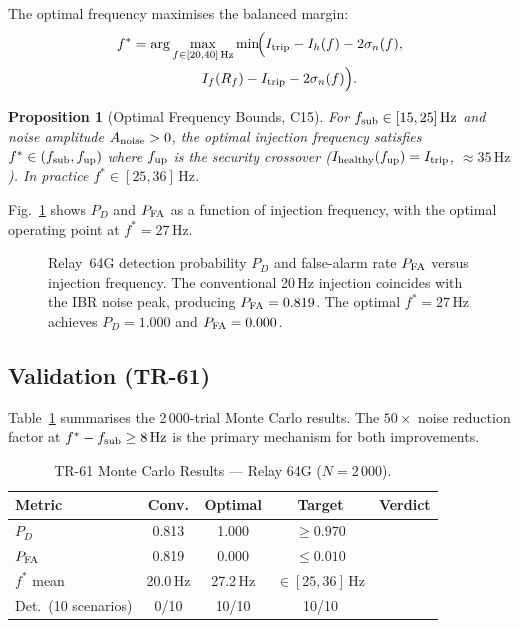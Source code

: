 \documentclass[journal,twoside]{IEEEtran}
\newcommand{\cmark}{\ding{51}}
\newtheorem{proposition}{Proposition}
\begin{document}
The optimal frequency maximises the balanced margin:
\begin{equation}
\begin{split}
  f^* &= \arg\max_{f \in [20,40]\,\text{Hz}}
  \min\!\Bigl(
    I_{\rm trip} - I_h(f) - 2\sigma_n(f),\\
  &\qquad\qquad\quad
    I_f(R_f) - I_{\rm trip} - 2\sigma_n(f)
  \Bigr).
\end{split}
  \label{eq:fopt}
\end{equation}

\begin{proposition}[Optimal Frequency Bounds, C15]
\label{prop:fopt}
For $f_{\rm sub} \in [15, 25]\,\text{Hz}$ and noise amplitude $A_{\rm noise} > 0$,
the optimal injection frequency satisfies $f^* \in (f_{\rm sub}, f_{\rm up})$
where $f_{\rm up}$ is the security crossover
($I_{\rm healthy}(f_{\rm up}) = I_{\rm trip}$, $\approx 35\,\text{Hz}$).
In practice $f^* \in [25, 36]\,\text{Hz}$.
\end{proposition}

Fig.~\ref{fig:fopt} shows $P_D$ and $P_{\rm FA}$ as a function of injection
frequency, with the optimal operating point at $f^* = 27\,\text{Hz}$.

\begin{figure}[t]
  \centering
  
  \caption{Relay~64G detection probability $P_D$ and false-alarm rate
    $P_{\rm FA}$ versus injection frequency.
    The conventional 20\,Hz injection coincides with the IBR noise peak,
    producing $P_{\rm FA} = 0.819$.  The optimal $f^* = 27\,\text{Hz}$
    achieves $P_D = 1.000$ and $P_{\rm FA} = 0.000$.}
  \label{fig:fopt}
\end{figure}

\subsection{Validation (TR-61)}

Table~\ref{tab:64g_mc} summarises the 2\,000-trial Monte Carlo results.
The $50\times$ noise reduction factor at $f^* - f_{\rm sub} \geq 8\,\text{Hz}$
is the primary mechanism for both improvements.

\begin{table}[h]
  \centering
  \caption{TR-61 Monte Carlo Results --- Relay 64G ($N = 2\,000$).}
  \label{tab:64g_mc}
  \begin{tabular}{@{}p{2.0cm}cccc@{}}
    \toprule
    Metric & Conv. & Optimal & Target & Verdict \\
    \midrule
    $P_D$ & 0.813 & 1.000 & $\geq 0.970$ & \cmark \\
    $P_{\rm FA}$ & 0.819 & 0.000 & $\leq 0.010$ & \cmark \\
    $f^*$ mean & 20.0\,Hz & 27.2\,Hz & ${\in}[25,36]$\,Hz & \cmark \\
    Det.\ (10 scenarios) & 0/10 & 10/10 & 10/10 & \cmark \\
    \bottomrule
  \end{tabular}
\end{table}
\end{document}
